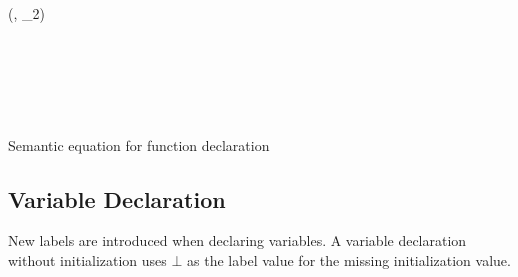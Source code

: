 \begin{table}[H]
\begin{semanticequations}
{(\icstr, \ienvF_2)}{
   \\
   \\
   \\
   \\
   \\
   \\
}
\end{semanticequations}
\caption{Semantic equation for function declaration}
\label{cstr:functiondeclaration}
\end{table}

\subsection{Variable Declaration}
New labels are introduced when declaring variables.
A variable declaration without initialization uses $\bot$ as the label value for the missing initialization value.


